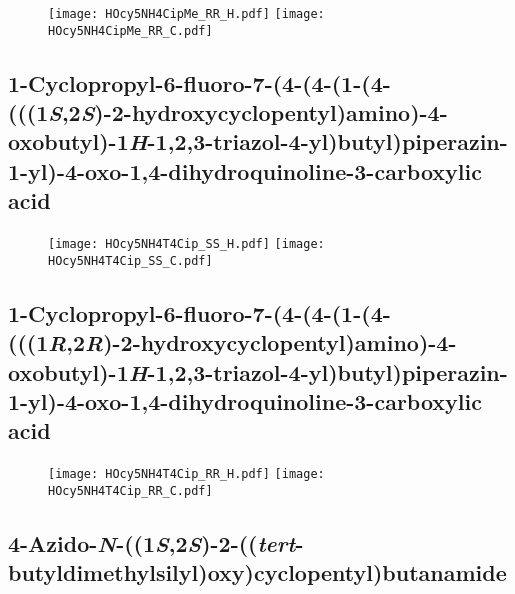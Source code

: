 \begin{figure}[H]
	\centering
		\texttt{[image: HOcy5NH4CipMe\_RR\_H.pdf]}
		\texttt{[image: HOcy5NH4CipMe\_RR\_C.pdf]}
\end{figure}

\subsection{1\hyp{}Cyclopropyl\hyp{}6\hyp{}fluoro\hyp{}7\hyp{}(4\hyp{}(4\hyp{}(1\hyp{}(4\hyp{}(((1\textit{S},2\textit{S})\hyp{}2\hyp{}hydroxycyclopentyl)amino)\hyp{}4\hyp{}oxobutyl)\hyp{}1\textit{H}\hyp{}1,2,3\hyp{}triazol\hyp{}4\hyp{}yl)butyl)piperazin\hyp{}1\hyp{}yl)\hyp{}4\hyp{}oxo\hyp{}1,4\hyp{}dihydroquin\allowbreak oline\hyp{}3\hyp{}carboxylic acid }

\begin{figure}[H]
	\centering
		\texttt{[image: HOcy5NH4T4Cip\_SS\_H.pdf]}
		\texttt{[image: HOcy5NH4T4Cip\_SS\_C.pdf]}
\end{figure}

\subsection{1\hyp{}Cyclopropyl\hyp{}6\hyp{}fluoro\hyp{}7\hyp{}(4\hyp{}(4\hyp{}(1\hyp{}(4\hyp{}(((1\textit{R},2\textit{R})\hyp{}2\hyp{}hydroxycyclopentyl)amino)\hyp{}4\hyp{}oxobutyl)\hyp{}1\textit{H}\hyp{}1,2,3\hyp{}triazol\hyp{}4\hyp{}yl)butyl)piperazin\hyp{}1\hyp{}yl)\hyp{}4\hyp{}oxo\hyp{}1,4\hyp{}dihydroquin\allowbreak oline\hyp{}3\hyp{}carboxylic acid }

\begin{figure}[H]
	\centering
		\texttt{[image: HOcy5NH4T4Cip\_RR\_H.pdf]}
		\texttt{[image: HOcy5NH4T4Cip\_RR\_C.pdf]}
\end{figure}

\subsection{4\hyp{}Azido\hyp{}\textit{N}\hyp{}((1\textit{S},2\textit{S})\hyp{}2\hyp{}((\textit{tert}\hyp{}butyldimethylsilyl)oxy)cyclopentyl)butanamide }

